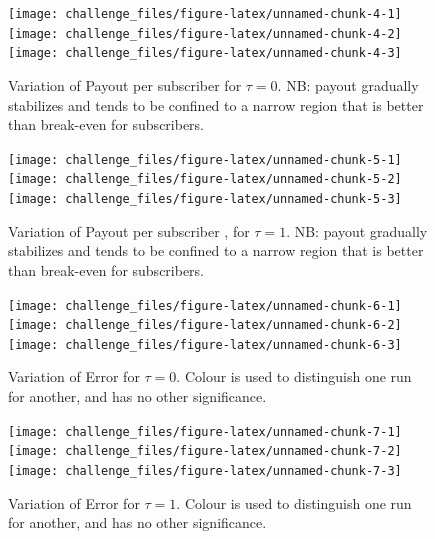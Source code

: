 \documentclass[]{article}
\begin{document}
\begin{figure}[p]

{\centering \texttt{[image: challenge\_files/figure-latex/unnamed-chunk-4-1]} \texttt{[image: challenge\_files/figure-latex/unnamed-chunk-4-2]} \texttt{[image: challenge\_files/figure-latex/unnamed-chunk-4-3]} 

}

\caption{\label{fig:plot_outgoings0}Variation of Payout per subscriber for $\tau=0$. NB: payout gradually stabilizes and tends to be confined to a narrow region that is better than break-even for subscribers.}\label{fig:unnamed-chunk-4}
\end{figure}

\begin{figure}[p]

{\centering \texttt{[image: challenge\_files/figure-latex/unnamed-chunk-5-1]} \texttt{[image: challenge\_files/figure-latex/unnamed-chunk-5-2]} \texttt{[image: challenge\_files/figure-latex/unnamed-chunk-5-3]} 

}

\caption{\label{fig:plot_outgoings1}Variation of Payout per subscriber , for $\tau=1$. NB: payout gradually stabilizes and tends to be confined to a narrow region that is better than break-even for subscribers.}\label{fig:unnamed-chunk-5}
\end{figure}

\begin{figure}[p]

{\centering \texttt{[image: challenge\_files/figure-latex/unnamed-chunk-6-1]} \texttt{[image: challenge\_files/figure-latex/unnamed-chunk-6-2]} \texttt{[image: challenge\_files/figure-latex/unnamed-chunk-6-3]} 

}

\caption{\label{fig:plot_sq0}Variation of Error for $\tau=0$. Colour is used to distinguish one run for another, and has no other significance.}\label{fig:unnamed-chunk-6}
\end{figure}

\begin{figure}[p]

{\centering \texttt{[image: challenge\_files/figure-latex/unnamed-chunk-7-1]} \texttt{[image: challenge\_files/figure-latex/unnamed-chunk-7-2]} \texttt{[image: challenge\_files/figure-latex/unnamed-chunk-7-3]} 

}

\caption{\label{fig:plot_sq1}Variation of Error for $\tau=1$. Colour is used to distinguish one run for another, and has no other significance.}\label{fig:unnamed-chunk-7}
\end{figure}
\end{document}
